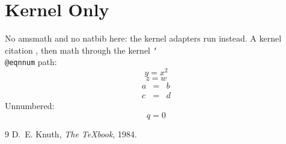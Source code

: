 \documentclass[twocolumn]{article}
\begin{document}
\section{Kernel Only}
\label{sec:k}

No amsmath and no natbib here: the kernel adapters run instead. A kernel
citation \cite{knuth1984texbook}, then math through the kernel
\texttt{\char`\\@eqnnum} path:
\begin{equation}\label{eq:k} y=x^2 \end{equation}
\begin{equation} z=w \end{equation}
\begin{eqnarray} a&=&b \nonumber\\ c&=&d \end{eqnarray}
Unnumbered: \[ q=0 \]

\begin{thebibliography}{9}
 D.~E. Knuth, \emph{The TeXbook}, 1984.
\end{thebibliography}
\end{document}
